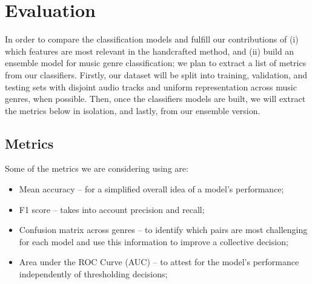 \section{Evaluation}

In order to compare the classification models and fulfill our contributions of (i) which features are most relevant in the handcrafted method, and (ii) build an ensemble model for music genre classification; we plan to extract a list of metrics from our classifiers. Firstly, our dataset will be split into training, validation, and testing sets with disjoint audio tracks and uniform representation across music genres, when possible. Then, once the classifiers models are built, we will extract the metrics below in isolation, and lastly, from our ensemble version.

\subsection{Metrics}

Some of the metrics we are considering using are:

\begin{itemize}
    \item Mean accuracy -- for a simplified overall idea of a model's performance;
    \item F1 score -- takes into account precision and recall;
    \item Confusion matrix across genres -- to identify which pairs are most challenging for each model and use this information to improve a collective decision;
    \item Area under the ROC Curve (AUC) -- to attest for the model's performance independently of thresholding decisions;
\end{itemize}
